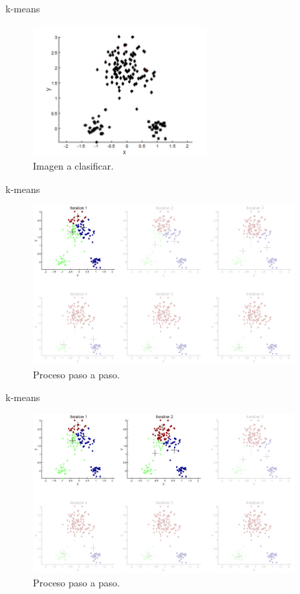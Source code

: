\documentclass[]{beamer}
\begin{document}
\begin{frame}{k-means}
  \begin{figure}
    \includegraphics[width=0.6\textwidth]{imagenes/byn.png}
    \caption{Imagen a clasificar.}
  \end{figure}
\end{frame}

\begin{frame}{k-means}
  \begin{figure}
    \includegraphics[width=0.9\textwidth]{imagenes/step1.png}
    \caption{Proceso paso a paso.}
  \end{figure}
\end{frame}

\begin{frame}{k-means}
  \begin{figure}
    \includegraphics[width=0.9\textwidth]{imagenes/step2.png}
    \caption{Proceso paso a paso.}
  \end{figure}
\end{frame}
\end{document}
